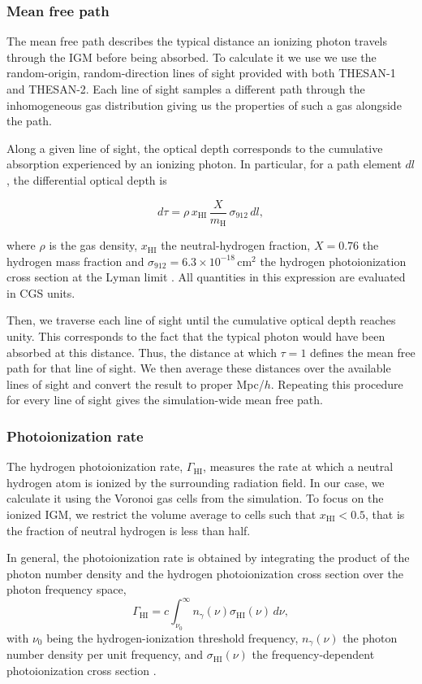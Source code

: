 \documentclass[%
 reprint,
nofootinbib,
 amsmath,amssymb,
 aps,
]{revtex4-2}
\begin{document}
\subsubsection{Mean free path}
The mean free path describes the typical distance an ionizing photon travels through the IGM before being absorbed. To calculate it we use we use the random-origin, random-direction lines of sight provided with both THESAN-1 and THESAN-2. Each line of sight samples a different path through the inhomogeneous gas distribution giving us the properties of such a gas alongside the path.

Along a given line of sight, the optical depth corresponds to the cumulative absorption experienced by an ionizing photon. In particular, for a path element $dl$, the differential optical depth is

\begin{equation}
d\tau = \rho\,x_{\mathrm{HI}}\,\frac{X}{m_{\mathrm H}}\,\sigma_{912}\,dl,
\end{equation}

where $\rho$ is the gas density, $x_{\mathrm{HI}}$ the neutral-hydrogen fraction, $X=0.76$ the hydrogen mass fraction and $\sigma_{912}=6.3\times10^{-18}\,\mathrm{cm^2}$ the hydrogen photoionization cross section at the Lyman limit \cite{verner1996atomic}. All quantities in this expression are evaluated in CGS units.

Then, we traverse each line of sight until the cumulative optical depth reaches unity. This corresponds to the fact that the typical photon would have been absorbed at this distance. Thus, the distance at which $\tau=1$ defines the mean free path for that line of sight. We then average these distances over the available lines of sight and convert the result to proper Mpc/$h$. Repeating this procedure for every line of sight gives the simulation-wide mean free path.

\subsubsection{Photoionization rate}
The hydrogen photoionization rate, $\Gamma_{\mathrm{HI}}$, measures the rate at which a neutral hydrogen atom is ionized by the surrounding radiation field. In our case, we calculate it using the Voronoi gas cells from the simulation. To focus on the ionized IGM, we restrict the volume average to cells such that $x_{\mathrm{HI}}<0.5$, that is the fraction of neutral hydrogen is less than half.

In general, the photoionization rate is obtained by integrating the product of the photon number density and the hydrogen photoionization cross section over the photon frequency space, 
\begin{equation}
\Gamma_{\mathrm{HI}}
=
c\int_{\nu_0}^{\infty}
n_\gamma(\nu)\sigma_{\mathrm{HI}}(\nu)\,d\nu,
\end{equation}
with $\nu_0$ being the hydrogen-ionization threshold frequency, $n_\gamma(\nu)$ the photon number density per unit frequency, and $\sigma_{\mathrm{HI}}(\nu)$ the frequency-dependent photoionization cross section \cite{verner1996atomic}.
\end{document}
